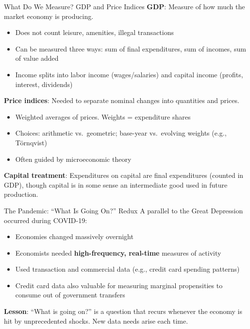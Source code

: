 \documentclass[blue]{beamer}
\begin{document}
\begin{frame}{What Do We Measure? GDP and Price Indices}
	\textbf{GDP}: Measure of how much the market economy is producing.
		\vspace{-6pt}
	\begin{itemize}
		\item Does not count leisure, amenities, illegal transactions
		\item Can be measured three ways: sum of final expenditures, sum of incomes, sum of value added
		\item Income splits into labor income (wages/salaries) and capital income (profits, interest, dividends)
	\end{itemize}
	\vspace{-6pt}
	\textbf{Price indices}: Needed to separate nominal changes into quantities and prices.
		\vspace{-5pt}
	\begin{itemize}
		\item Weighted averages of prices. Weights = expenditure shares
		\item Choices: arithmetic vs.\ geometric; base-year vs.\ evolving weights (e.g., T\"ornqvist)
		\item Often guided by microeconomic theory 
	\end{itemize}
	
	\vspace{-5pt}
	\textbf{Capital treatment}: Expenditures on capital are final expenditures (counted in GDP), though capital is in some sense an intermediate good used in future production.
\end{frame}

\begin{frame}{The Pandemic: ``What Is Going On?'' Redux}
	A parallel to the Great Depression occurred during {COVID-19}:
	\begin{itemize}
		\item Economies changed massively overnight
		\item Economists needed \textbf{high-frequency, real-time} measures of activity
		\item Used transaction and commercial data (e.g., credit card spending patterns)
		\item Credit card data also valuable for measuring marginal propensities to consume out of government transfers
	\end{itemize}
	
	\bigskip
	\textbf{Lesson}: ``What is going on?'' is a question that recurs whenever the economy is hit by unprecedented shocks. New data needs arise each time.
\end{frame}
\end{document}
